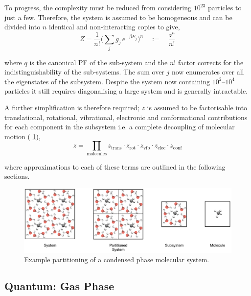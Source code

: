 \documentclass[../main.tex]{subfiles}
\begin{document}
To progress, the complexity must be reduced from considering $10^{23}$ particles to just a few. Therefore, the system is assumed to be homogeneous and can be divided into $n$ identical and non-interacting copies to give,
\begin{equation}
Z = \frac{1}{n!} {\Big (} \sum_j g_j \, e^{-\beta E_j} {\Big )}^n \quad := \quad \frac{z^n}{n!}
\label{Z_partion_q}
\end{equation}

where $q$ is the canonical PF of the sub-system and the $n!$ factor corrects for the indistinguishability of the sub-systems. The sum over $j$ now enumerates over all the eigenstates of the subsystem. Despite the system now containing $10^2$--$10^4$ particles it still requires diagonalising a large system and is generally intractable.

A further simplification is therefore required; $z$ is assumed to be factorisable into translational, rotational, vibrational, electronic and conformational contributions for each component in the subsystem i.e. a complete decoupling of molecular motion (\figurename{ \ref{fig::entropy_X1}}),
\begin{equation}
z = \prod_{\text{molecules}} z_\text{trans} \cdot z_\text{rot} \cdot z_\text{vib} \cdot z_\text{elec} \cdot z_\text{conf}
\label{equation::subsystem_pf}
\end{equation}

where approximations to each of these terms are outlined in the following sections.

\begin{figure}[h!]
	\centering
	\includegraphics[width=\textwidth]{4/figs/figX1/systems_methane_in_h2o.png}
	\caption{Example partitioning of a condensed phase molecular system.}
	\label{fig::entropy_X1}
\end{figure}



\subsection{Quantum: Gas Phase}
\end{document}
